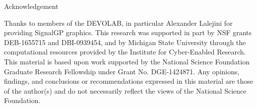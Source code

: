 \begin{block}{Acknowledgement}
{\footnotesize
Thanks to members of the DEVOLAB, in particular Alexander Lalejini for providing SignalGP graphics.
This research was supported in part by NSF grants DEB-1655715 and DBI-0939454, and by Michigan State University through the computational resources provided by the Institute for Cyber-Enabled Research.
This material is based upon work supported by the National Science Foundation Graduate Research Fellowship under Grant No. DGE-1424871.
Any opinions, findings, and conclusions or recommendations expressed in this material are those of the author(s) and do not necessarily reflect the views of the National Science Foundation.\par
}
\end{block}
